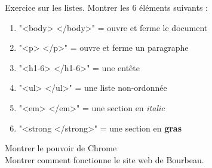 \documentclass[12pt]{report}
\begin{document}
    Exercice sur les listes. Montrer les 6 éléments suivants : \\
      \begin{enumerate}
        \item "<body> </body>" = ouvre et ferme le document
        \item "<p> </p>" = ouvre et ferme un paragraphe
        \item "<h1-6> </h1-6>" = une entête
        \item "<ul> </ul>" =  une liste non-ordonnée 
        \item "<em> </em>" = une section en \textit{italic}
        \item "<strong </strong>" = une section en \textbf{gras}
      \end{enumerate}
    
    Montrer le pouvoir de Chrome \\
    
    Montrer comment fonctionne le site web de Bourbeau. 
    
    
  
    
\end{document}
